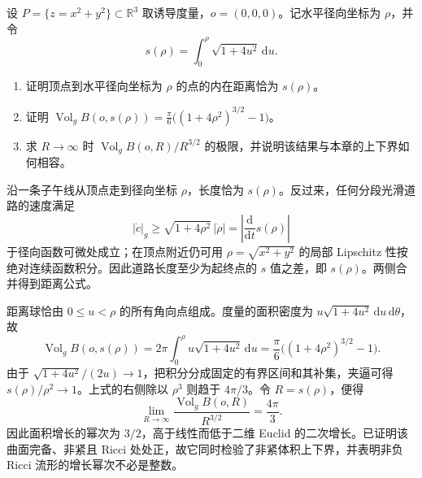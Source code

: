 \begin{exercise}\label{g3:ex:paraboloid-volume-growth}
	设 \(P=\{z=x^2+y^2\}\subset\mathbb R^3\) 取诱导度量，\(o=(0,0,0)\)。记水平径向坐标为 \(\rho\)，并令
	\[
		s(\rho)=\int_0^\rho\sqrt{1+4u^2}\,\mathrm du.
	\]
	\begin{enumerate}
		\item 证明顶点到水平径向坐标为 \(\rho\) 的点的内在距离恰为 \(s(\rho)\)。
		\item 证明 \(\operatorname{Vol}_g B(o,s(\rho))=\frac\pi6\bigl((1+4\rho^2)^{3/2}-1\bigr)\)。
		\item 求 \(R\to\infty\) 时 \(\operatorname{Vol}_g B(o,R)/R^{3/2}\) 的极限，并说明该结果与本章的上下界如何相容。
	\end{enumerate}
\end{exercise}
\begin{solution}
	沿一条子午线从顶点走到径向坐标 \(\rho\)，长度恰为 \(s(\rho)\)。反过来，任何分段光滑道路的速度满足
	\[
		|\dot c|_g\ge\sqrt{1+4\rho^2}\,|\dot\rho|
		=\left|\frac{\mathrm d}{\mathrm dt}s(\rho)\right|
	\]
	于径向函数可微处成立；在顶点附近仍可用 \(\rho=\sqrt{x^2+y^2}\) 的局部 Lipschitz 性按绝对连续函数积分。因此道路长度至少为起终点的 \(s\) 值之差，即 \(s(\rho)\)。两侧合并得到距离公式。

	距离球恰由 \(0\le u<\rho\) 的所有角向点组成。度量的面积密度为 \(u\sqrt{1+4u^2}\,\mathrm du\,\mathrm d\theta\)，故
	\[
		\operatorname{Vol}_g B(o,s(\rho))
		=2\pi\int_0^\rho u\sqrt{1+4u^2}\,\mathrm du
		=\frac\pi6\bigl((1+4\rho^2)^{3/2}-1\bigr).
	\]
	由于 \(\sqrt{1+4u^2}/(2u)\to1\)，把积分分成固定的有界区间和其补集，夹逼可得 \(s(\rho)/\rho^2\to1\)。上式的右侧除以 \(\rho^3\) 则趋于 \(4\pi/3\)。令 \(R=s(\rho)\)，便得
	\[
		\lim_{R\to\infty}\frac{\operatorname{Vol}_g B(o,R)}{R^{3/2}}
		=\frac{4\pi}{3}.
	\]
	因此面积增长的幂次为 \(3/2\)，高于线性而低于二维 Euclid 的二次增长。已证明该曲面完备、非紧且 Ricci 处处正，故它同时检验了非紧体积上下界，并表明非负 Ricci 流形的增长幂次不必是整数。
\end{solution}

